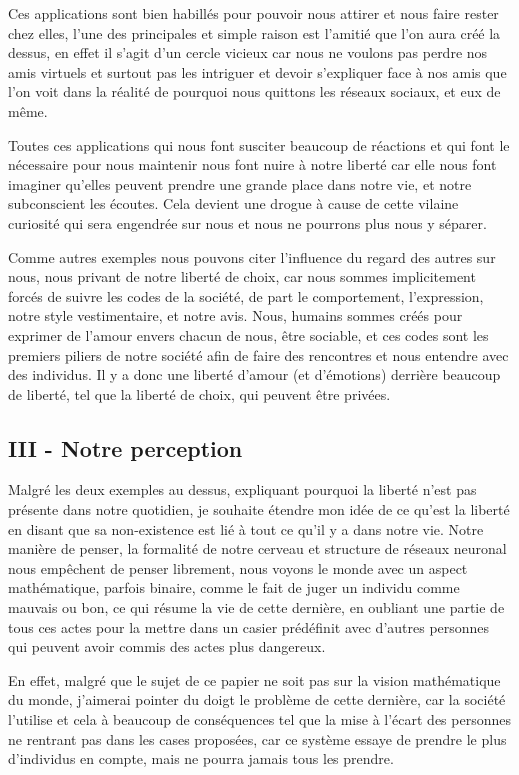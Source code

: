 \documentclass[twocolumn, french]{article}
\begin{document}
Ces applications sont bien habillés pour pouvoir nous attirer et nous 
faire rester chez elles, l'une des principales et simple raison est l'amitié que l'on aura créé 
la dessus, en effet il s'agit d'un cercle vicieux car nous ne voulons pas perdre nos amis virtuels 
et surtout pas les intriguer et devoir s'expliquer face à nos amis que l'on voit dans la réalité de 
pourquoi nous quittons les réseaux sociaux, et eux de même. 

Toutes ces applications qui nous font susciter beaucoup de réactions et qui font le nécessaire 
pour nous maintenir nous font nuire à notre liberté car elle nous font imaginer qu'elles peuvent 
prendre une grande place dans notre vie, et notre subconscient les écoutes. Cela devient une drogue
à cause de cette vilaine curiosité qui sera engendrée sur nous et nous ne pourrons plus nous y
séparer. 

Comme autres exemples nous pouvons citer l'influence du regard des autres sur nous, nous privant de 
notre liberté de choix, car nous sommes implicitement forcés de suivre les codes de la société, de part
le comportement, l'expression, notre style vestimentaire, et notre avis. Nous, humains sommes créés pour
exprimer de l'amour envers chacun de nous, être sociable, et ces codes sont les premiers piliers de notre
société afin de faire des rencontres et nous entendre avec des individus. Il y a donc une liberté d'amour 
(et d'émotions) derrière beaucoup de liberté, tel que la liberté de choix, qui peuvent être privées.
\subsection*{III - Notre perception}
Malgré les deux exemples au dessus, expliquant pourquoi la liberté n'est pas présente dans notre
quotidien, je souhaite étendre mon idée de ce qu'est la liberté en disant que sa non-existence 
est lié à tout ce qu'il y a dans notre vie. 
Notre manière de penser, la formalité de notre 
cerveau et structure de réseaux neuronal nous empêchent de penser librement, nous voyons le 
monde avec un aspect mathématique, parfois binaire, comme le fait de juger un individu comme 
mauvais ou bon, ce qui résume la vie de cette dernière, en oubliant une partie de tous ces actes
pour la mettre dans un casier prédéfinit avec d'autres personnes qui peuvent avoir commis des
actes plus dangereux. 

En effet, malgré que le sujet de ce papier ne soit pas sur la vision 
mathématique du monde, j'aimerai pointer du doigt le problème de cette dernière, car la société 
l'utilise et cela à beaucoup de conséquences tel que la mise à l'écart des personnes ne rentrant
pas dans les cases proposées, car ce système essaye de prendre le plus d'individus en compte, mais 
ne pourra jamais tous les prendre. 
\end{document}
